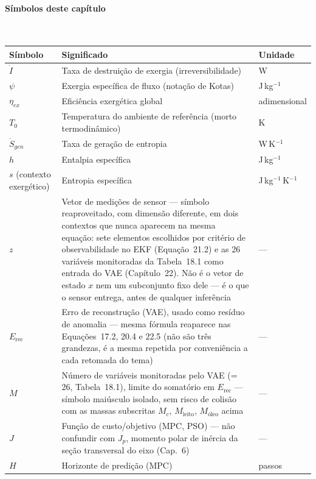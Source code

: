 \documentclass[12pt,a4paper]{article}
\numberwithin{equation}{section}
\numberwithin{table}{section}
\numberwithin{figure}{section}
\begin{document}
\paragraph{Símbolos deste capítulo}\mbox{}\\[-0.5em]
{\small
\begin{longtable}{>{\raggedright\arraybackslash}p{2.6cm} >{\raggedright\arraybackslash}p{9.2cm} >{\raggedright\arraybackslash}p{2.6cm}}
	\toprule
	\textbf{Símbolo} & \textbf{Significado} & \textbf{Unidade} \\ \midrule
	\endhead
	$\dot{I}$ & Taxa de destruição de exergia (irreversibilidade) & W \\
	$\psi$\dag & Exergia específica de fluxo (notação de Kotas) & J\,kg$^{-1}$ \\
	$\eta_{ex}$ & Eficiência exergética global & adimensional \\
	$T_0$ & Temperatura do ambiente de referência (morto termodinâmico) & K \\
	$\dot{S}_{gen}$ & Taxa de geração de entropia & W\,K$^{-1}$ \\
	$h$ & Entalpia específica & J\,kg$^{-1}$ \\
	$s$ (contexto exergético) & Entropia específica & J\,kg$^{-1}$\,K$^{-1}$ \\
	$z$ & Vetor de medições de sensor — símbolo reaproveitado, com dimensão diferente, em dois contextos que nunca aparecem na mesma equação: sete elementos escolhidos por critério de observabilidade no EKF (Equação~21.2) e as 26 variáveis monitoradas da Tabela~18.1 como entrada do VAE (Capítulo~22). Não é o vetor de estado $x$ nem um subconjunto fixo dele — é o que o sensor entrega, antes de qualquer inferência & --- \\
	$E_{\text{rec}}$ & Erro de reconstrução (VAE), usado como resíduo de anomalia — mesma fórmula reaparece nas Equações~17.2, 20.4 e 22.5 (não são três grandezas, é a mesma repetida por conveniência a cada retomada do tema) & --- \\
	$M$ & Número de variáveis monitoradas pelo VAE (= 26, Tabela~18.1), limite do somatório em $E_{\text{rec}}$ — símbolo maiúsculo isolado, sem risco de colisão com as massas subscritas $M_c$, $M_{\text{leito}}$, $M_{\text{óleo}}$ acima & --- \\
	$J$ & Função de custo/objetivo (MPC, PSO) — não confundir com $J_p$, momento polar de inércia da seção transversal do eixo (Cap.~6) & --- \\
	$H$ & Horizonte de predição (MPC) & passos \\
	\bottomrule
\end{longtable}
}
\end{document}
